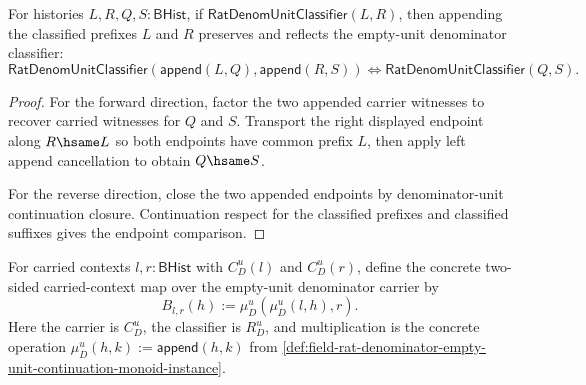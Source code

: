 \begin{theorem}
\label{thm:rat-denom-unit-classifier-append-left-context-cancel-iff}
For histories $L,R,Q,S:\mathsf{BHist}$, if
$\mathsf{RatDenomUnitClassifier}(L,R)$, then appending the classified prefixes
$L$ and $R$ preserves and reflects the empty-unit denominator classifier:
$$
\mathsf{RatDenomUnitClassifier}(\mathsf{append}(L,Q),\mathsf{append}(R,S))
\Longleftrightarrow
\mathsf{RatDenomUnitClassifier}(Q,S).
$$
\end{theorem}
\begin{proof}
For the forward direction, factor the two appended carrier witnesses to recover
carried witnesses for $Q$ and $S$. Transport the right displayed endpoint along
$R\hsame L$ so both endpoints have common prefix $L$, then apply left append
cancellation to obtain $Q\hsame S$.

For the reverse direction, close the two appended endpoints by denominator-unit
continuation closure. Continuation respect for the classified prefixes and
classified suffixes gives the endpoint comparison.
\end{proof}

\begin{definition}
\label{def:field-rat-denominator-empty-unit-bilateral-multiplication-context}
For carried contexts $l,r:\mathsf{BHist}$ with $C_D^u(l)$ and $C_D^u(r)$, define
the concrete two-sided carried-context map over the empty-unit denominator
carrier by
$$
B_{l,r}(h):=\mu_D^u(\mu_D^u(l,h),r).
$$
Here the carrier is $C_D^u$, the classifier is $R_D^u$, and multiplication is the
concrete operation $\mu_D^u(h,k):=\mathsf{append}(h,k)$ from
\autoref{def:field-rat-denominator-empty-unit-continuation-monoid-instance}.
\end{definition}

